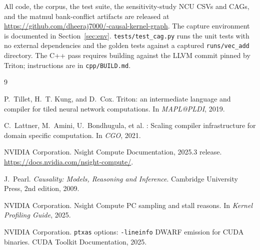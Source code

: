 \documentclass[10pt]{article}
\begin{document}
All code, the corpus, the test suite, the sensitivity-study NCU CSVs and CAGs, and the matmul bank-conflict artifacts are released at \url{https://github.com/dheeraj7000/-causal-kernel-graph}. The capture environment is documented in Section~\ref{sec:env}. \texttt{tests/test\_cag.py} runs the unit tests with no external dependencies and the golden tests against a captured \texttt{runs/vec\_add} directory. The C++ pass requires building against the LLVM commit pinned by Triton; instructions are in \texttt{cpp/BUILD.md}.

\begin{thebibliography}{9}

P.~Tillet, H.~T. Kung, and D.~Cox.
\newblock Triton: an intermediate language and compiler for tiled neural network
  computations.
\newblock In \emph{MAPL@PLDI}, 2019.

C.~Lattner, M.~Amini, U.~Bondhugula, et al.
: Scaling compiler infrastructure for domain specific
  computation.
\newblock In \emph{CGO}, 2021.

NVIDIA Corporation.
\newblock Nsight Compute Documentation, 2025.3 release.
\newblock \url{https://docs.nvidia.com/nsight-compute/}.

J.~Pearl.
\newblock \emph{Causality: Models, Reasoning and Inference}.
\newblock Cambridge University Press, 2nd edition, 2009.

NVIDIA Corporation.
\newblock Nsight Compute PC sampling and stall reasons.
\newblock In \emph{Kernel Profiling Guide}, 2025.

NVIDIA Corporation.
\newblock \texttt{ptxas} options: \texttt{-lineinfo} DWARF emission for CUDA
  binaries.
\newblock CUDA Toolkit Documentation, 2025.

\end{thebibliography}
\end{document}
